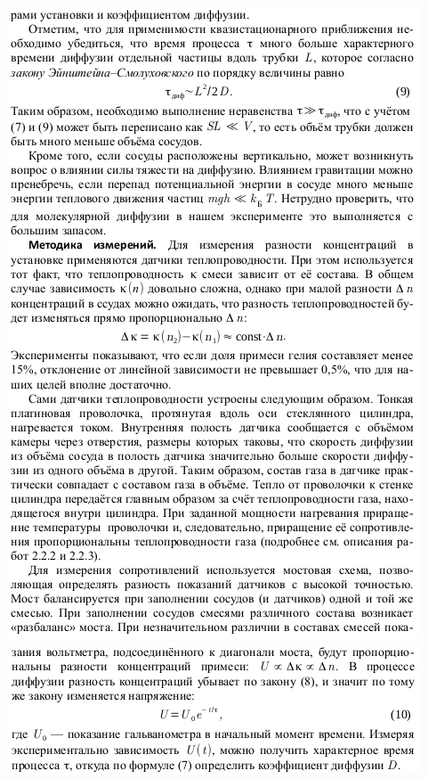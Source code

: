 \documentclass[12pt,a4paper]{article}
\begin{document}
	\includegraphics[scale=1.5]{4.png}
	\newpage	
	\includegraphics[scale=1.5]{5.png}
	
\end{document}
